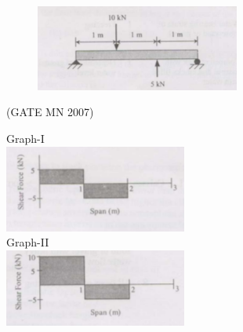 \documentclass[journal]{IEEEtran}
\begin{document}
\begin{enumerate}
\begin{figure}[H]
    \centering
\includegraphics[width=0.6\textwidth]{Screenshot_2025_0812_143315.png}
\caption*{}
    \label{fig:Q43}
\end{figure}
\hfill (GATE MN 2007)
\begin{multicols}{2}
	Graph-I \\
\includegraphics[width=0.45\textwidth]{Screenshot_2025_0812_143545.png} \\
Graph-II \\
\includegraphics[width=0.45\textwidth]{Screenshot_2025_0812_143610.png} \\


\end{multicols}
\end{enumerate}
\end{document}
